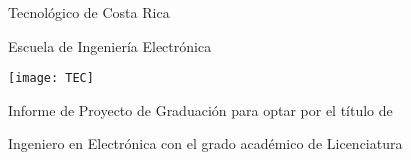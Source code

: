 
\thispagestyle{empty} 

\begin{center}

Tecnológico de Costa Rica

\par\vspace{1ex}

Escuela de Ingeniería Electrónica

\par\vspace{20mm}

\texttt{[image: TEC]}

\par\vspace*{\fill}

{\large\bf{\scriptTitle}}

\par\vspace*{\fill}

Informe de Proyecto de Graduación para optar por el título de

Ingeniero en Electrónica con el grado académico de Licenciatura

\par\vspace{20mm}

\scriptAuthor

\vspace*{\fill}

\end{center}
\newpage 
\cleardoublepage 



